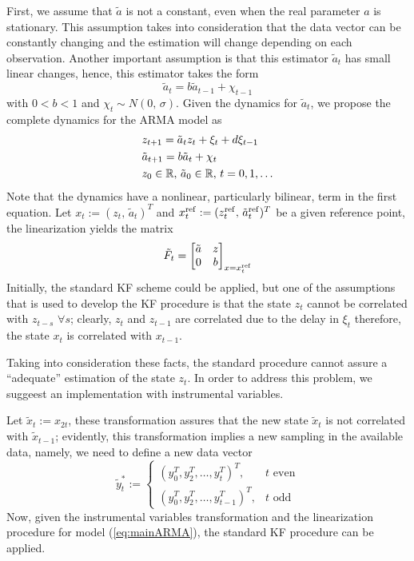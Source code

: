 First, we assume that $\tilde{a}$ is not a constant, even when the real parameter $a$ is stationary. This assumption takes into consideration that the data vector can be constantly changing and the estimation will change depending on each observation. Another important assumption is that this estimator $\tilde{a}_t$ has small linear changes, hence, this estimator takes the form
\begin{equation}
  \tilde{a}_t=b\tilde{a}_{t-1}+\chi_{t-1}
\end{equation}
with $0<b<1$ and $\chi_t \sim N(0,\,\sigma)$. Given the dynamics for $\tilde{a}_t$, we propose the complete dynamics for the ARMA model as
\begin{equation}\label{eq:mainARMA}
  \begin{split}
    &z_{t+1}=\tilde{a}_tz_t+\xi_t+d\xi_{t-1}\\
    &\tilde{a}_{t+1}=b\tilde{a}_t+\chi_t\\
    &z_0\in\R,\,\tilde{a}_0\in\R,\,t=0,1,\dots
  \end{split}
\end{equation}
Note that the dynamics have a nonlinear, particularly bilinear, term in the first equation. Let $x_t:=(z_t,\,\tilde{a}_t)^T$ and $x^{{\rm ref}}_t:=(z_t^{{\rm ref}},\,\tilde{a}_t^{{\rm ref}})^T$ be a given reference point, the linearization yields the matrix
\[
\tilde{F}_t = \begin{bmatrix}
\tilde{a} & z\\
0 & b
\end{bmatrix}_{x=x_t^{{\rm ref}}}
\]
Initially, the standard KF scheme could be applied, but one of the assumptions that is used to develop the KF procedure is that the state $z_t$ cannot be correlated with $z_{t-s}$ $\forall s$; clearly, $z_t$ and $z_{t-1}$ are correlated due to the delay in $\xi_t$ therefore, the state $x_t$ is correlated with $x_{t-1}$.

Taking into consideration these facts, the standard procedure cannot assure a ``adequate'' estimation of the state $z_t$. In order to address this problem, we suggeest an implementation with instrumental variables.

Let $\tilde{x}_t:=x_{2t}$, these transformation assures that the new state $\tilde{x}_t$ is not correlated with $\tilde{x}_{t-1}$; evidently, this transformation implies a new sampling in the available data, namely, we need to define a new data vector
 \[\tilde{y}_t^*:=\begin{cases}
   (y_0^T, y_2^T,\ldots,y_t^T)^T,&t\text{ even}\\
   (y_0^T, y_2^T,\ldots,y_{t-1}^T)^T,&t\text{ odd}
 \end{cases}\]
Now, given the instrumental variables transformation and the linearization procedure for model (\ref{eq:mainARMA}), the standard KF procedure can be applied.
